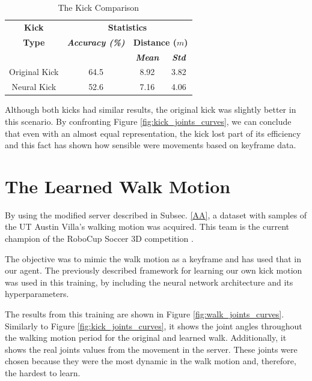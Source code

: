 \begin{table}[htbp]
\caption{The Kick Comparison}
\begin{center} 
\begin{tabular}{|c|c|c|c|}
\hline
\textbf{Kick}&\multicolumn{3}{|c|}{\textbf{Statistics}} \\
\cline{2-4} 
\textbf{Type} & \textbf{\textit{Accuracy (\%)}}& \multicolumn{2}{|c|}{\textbf{Distance (\(m\))}} \\ 
\cline {3-4}
& & \textbf{\textit{Mean}}& \textbf{\textit{Std}} \\
\hline
Original Kick & 64.5 & 8.92 & 3.82  \\
\hline
Neural Kick & 52.6 & 7.16 & 4.06 \\
\hline
\end{tabular}
\label{tab_kicks_statistics}
\end{center}
\end{table}

Although both kicks had similar results, the original kick was slightly better in this scenario. By confronting Figure \ref{fig:kick_joints_curves}, we can conclude that even with an almost equal representation, the kick lost part of its efficiency and this fact has shown how sensible were movements based on keyframe data.

\section{The Learned Walk Motion}
By using the modified server described in Subsec. \ref{AA}, a dataset with samples of the UT Austin Villa's walking motion \cite{macalpine2013} was acquired. This team is the current champion of the RoboCup Soccer 3D competition \cite{macalpine2017}.

The objective was to mimic the walk motion as a keyframe and has used that in our agent. The previously described framework for learning our own kick motion was used in this training, by including the neural network architecture and its hyperparameters.

The results from this training are shown in Figure \ref{fig:walk_joints_curves}. Similarly to Figure \ref{fig:kick_joints_curves}, it shows the joint angles throughout the walking motion period for the original and learned walk. Additionally, it shows the real joints values from the movement in the server. These joints were chosen because they were the most dynamic in the walk motion and, therefore, the hardest to learn.

